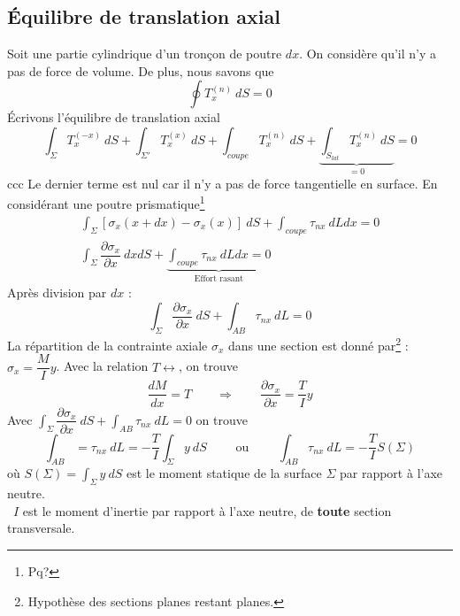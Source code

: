 	\subsection{Équilibre de translation axial}
	Soit une partie cylindrique d'un tronçon de poutre $dx$. On considère qu'il 
	n'y a pas de force de volume. De plus, nous savons que
	\begin{equation}
	\oint T_x^{(n)}\ dS = 0
	\end{equation}
	Écrivons l'équilibre de translation axial
	\begin{equation}
	\int_\Sigma T_x^{(-x)}\ dS + \int_{\Sigma'} T_x^{(x)}\ dS + \int_{coupe} T_x^{(n)}\ 
	dS + \underbrace{\int_{S_{lat}}T_x^{(n)}\ dS}_{=0} = 0
	\end{equation}\newpage	ccc
	Le dernier terme est nul car il n'y a pas de force tangentielle en surface. 
	En considérant une poutre prismatique\footnote{Pq?}
	\begin{eqnarray}
	\int_\Sigma [\sigma_x(x+dx)-\sigma_x(x)]\ dS + \int_{coupe} \tau_{nx}\ dLdx = 0\\
	\int_\Sigma \dfrac{\partial \sigma_x}{\partial x}\ dxdS + \underbrace{\int_{coupe} 
	\tau_{nx}\ 	dLdx = 0}_{\text{Effort rasant}}
	\end{eqnarray}
	Après division par $dx$ :
	\begin{equation}
	\int_\Sigma \dfrac{\partial \sigma_x}{\partial x}\ dS + \int_{AB}\tau_{nx}\ dL=0
	\end{equation}
	La répartition de la contrainte 
	axiale $\sigma_x$ dans une section est donné par\footnote{Hypothèse des sections 
	planes restant planes.} :$\sigma_x = \dfrac{M}{I}y$.
	Avec la relation $T\leftrightarrow$, on trouve 
	\begin{equation}
	\dfrac{dM}{dx}= T\qquad\Longrightarrow\qquad \dfrac{\partial\sigma_x}{\partial x}
	=\dfrac{T}{I}y
	\end{equation}
	Avec $\int_\Sigma \dfrac{\partial \sigma_x}{\partial x}\ dS + \int_{AB}\tau_{nx}\ 
	dL=0$ on trouve
	\begin{equation}
	\int_{AB} = \tau_{nx}\ dL = -\dfrac{T}{I}\int_\Sigma y\ dS\qquad\text{ ou }\qquad 
	\int_{AB} \tau_{nx}\ dL = -\dfrac{T}{I}S(\Sigma)
	\end{equation}
	où $S(\Sigma) = \int_\Sigma y\ dS$ est le moment statique de la surface $\Sigma$ 
	par rapport à l'axe neutre.\\
	\danger\  $I$ est le moment d'inertie par rapport à l'axe neutre, de \textbf{toute} 
	section transversale.
	
